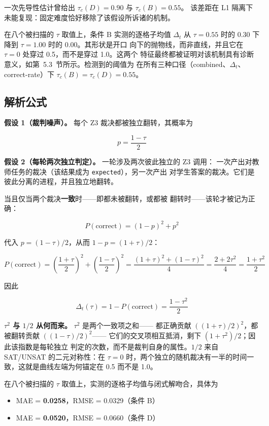 \documentclass{article}
\begin{document}
一次先导性估计曾给出 $\tau_c(D) = 0.90$ 与 $\tau_c(B) = 0.55$。
该差距在 L1 隔离下未能复现：固定难度恰好移除了该假设所诉诸的机制。

在八个被扫描的 $\tau$ 取值上，条件 B 实测的逐格子均值 $\Delta_t$ 从
$\tau = 0.55$ 时的 0.30 下降到 $\tau = 1.00$ 时的 0.00。其形状是开口
向下的抛物线，而非直线，并且它在 $\tau = 0$ 处穿过 0.5，而不是穿过 1.0。这两个
特征最终都被证明对该机制具有诊断意义，如第~5.3~节所示。检测到的阈值为
在所有三种口径（combined、$\Delta_t$、correct-rate）下 $\tau_c(B) = \tau_c(D) = 0.55$。

\subsection{解析公式}
\label{sec:analytical}

\textbf{假设 1（裁判噪声）。} 每个 Z3 裁决都被独立翻转，其概率为

\[
  p = \frac{1-\tau}{2}
\]

\textbf{假设 2（每轮两次独立判定）。} 一轮涉及两次彼此独立的 Z3 调用：
一次产出对教师任务的裁决（该结果成为 \texttt{expected}），另一次产出
对学生答案的裁决。它们是彼此分离的进程，并且独立地翻转。

当且仅当两个裁决\textbf{一致}时——即都未被翻转，或都被
翻转时——该轮才被记为正确：

\[
  P(\text{correct}) = (1-p)^2 + p^2
\]

代入 $p = (1-\tau)/2$，从而 $1-p = (1+\tau)/2$：

\[
  P(\text{correct}) = \left(\frac{1+\tau}{2}\right)^2 + \left(\frac{1-\tau}{2}\right)^2
  = \frac{(1+\tau)^2 + (1-\tau)^2}{4} = \frac{2 + 2\tau^2}{4} = \frac{1+\tau^2}{2}
\]

因此

\[
  \boxed{\;\Delta_t(\tau) = 1 - P(\text{correct}) = \frac{1-\tau^2}{2}\;}
\]

\textbf{$\tau^2$ 与 $1/2$ 从何而来。} $\tau^2$ 是两个一致项之和——
都正确贡献 $((1+\tau)/2)^2$，都被翻转贡献 $((1-\tau)/2)^2$——
它们的交叉项相互抵消，剩下 $(1+\tau^2)/2$；因此该指数是每轮独立
判定的次数，而不是裁判自身的属性。$1/2$ 来自 SAT/UNSAT 的二元对称性：在
$\tau = 0$ 时，两个独立的随机裁决有一半的时间一致，这就是曲线左端为何锚定在
0.5 而不是 1.0。

在八个被扫描的 $\tau$ 取值上，实测的逐格子均值与闭式解吻合，具体为

\begin{itemize}
  \item MAE = \textbf{0.0258}，RMSE = 0.0329（条件 B）
  \item MAE = \textbf{0.0520}，RMSE = 0.0660（条件 D）
\end{itemize}
\end{document}
